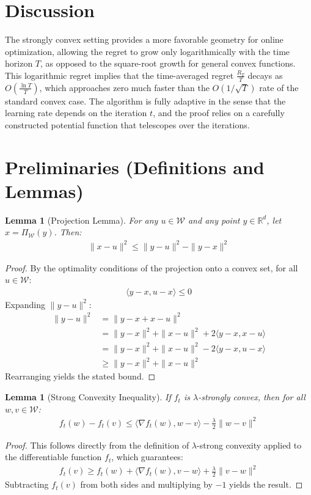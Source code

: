 \documentclass{article}
\newtheorem{lemma}[theorem]{Lemma}
\begin{document}
\section*{Discussion}
The strongly convex setting provides a more favorable geometry for online optimization, allowing the regret to grow only logarithmically with the time horizon $T$, as opposed to the square-root growth for general convex functions. This logarithmic regret implies that the time-averaged regret $\frac{R_T}{T}$ decays as $O(\frac{\ln T}{T})$, which approaches zero much faster than the $O(1/\sqrt{T})$ rate of the standard convex case. The algorithm is fully adaptive in the sense that the learning rate depends on the iteration $t$, and the proof relies on a carefully constructed potential function that telescopes over the iterations.

\section*{Preliminaries (Definitions and Lemmas)}
\begin{lemma}[Projection Lemma]
For any $u \in \mathcal{W}$ and any point $y \in \mathbb{R}^d$, let $x = \Pi_{\mathcal{W}}(y)$. Then:
\begin{align*}
\|x - u\|^2 \leq \|y - u\|^2 - \|y - x\|^2
\end{align*}
\end{lemma}
\begin{proof}
By the optimality conditions of the projection onto a convex set, for all $u \in \mathcal{W}$:
\begin{align*}
\langle y - x, u - x \rangle \leq 0
\end{align*}
Expanding $\|y - u\|^2$:
\begin{align*}
\|y - u\|^2 &= \|y - x + x - u\|^2 \\
&= \|y - x\|^2 + \|x - u\|^2 + 2 \langle y - x, x - u \rangle \\
&= \|y - x\|^2 + \|x - u\|^2 - 2 \langle y - x, u - x \rangle \\
&\geq \|y - x\|^2 + \|x - u\|^2
\end{align*}
Rearranging yields the stated bound.
\end{proof}

\begin{lemma}[Strong Convexity Inequality]
If $f_t$ is $\lambda$-strongly convex, then for all $w, v \in \mathcal{W}$:
\begin{align*}
f_t(w) - f_t(v) \leq \langle \nabla f_t(w), w - v \rangle - \frac{\lambda}{2} \|w - v\|^2
\end{align*}
\end{lemma}
\begin{proof}
This follows directly from the definition of $\lambda$-strong convexity applied to the differentiable function $f_t$, which guarantees:
\begin{align*}
f_t(v) \geq f_t(w) + \langle \nabla f_t(w), v - w \rangle + \frac{\lambda}{2} \|v - w\|^2
\end{align*}
Subtracting $f_t(v)$ from both sides and multiplying by $-1$ yields the result.
\end{proof}
\end{document}
